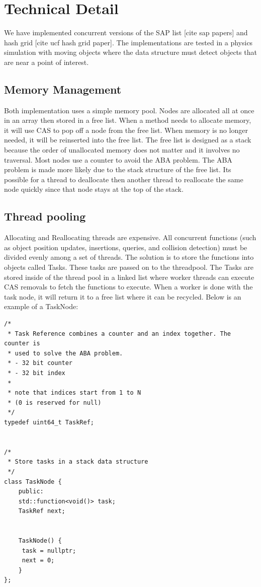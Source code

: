 \documentclass[conference]{IEEEtran}
\begin{document}
\section{Technical Detail}
We have implemented concurrent versions of the SAP list [cite sap papers] and hash grid [cite ucf hash grid paper]. The implementations are tested in a physics simulation with moving objects where the data structure must detect objects that are near a point of interest.
	\subsection{Memory Management}
	Both implementation uses a simple memory pool. Nodes are allocated all at once in an array then stored in a free list. When a method needs to allocate memory, it will use CAS to pop off a node from the free list. When memory is no longer needed, it will be reinserted into the free list. The free list is designed as a stack because the order of unallocated memory does not matter and it involves no traversal. Most nodes use a counter to avoid the ABA problem. The ABA problem is made more likely due to the stack structure of the free list. It\textquotesingle s possible for a thread to deallocate then another thread to reallocate the same node quickly since that node stays at the top of the stack.
	
	\subsection{Thread pooling}
	Allocating and Reallocating threads are expensive. All concurrent functions (such as object position updates, insertions, queries, and collision detection) must be divided evenly among a set of threads. The solution is to store the functions into objects called Tasks. These tasks are passed on to the threadpool. The Tasks are stored inside of the thread pool in a linked list where worker threads can execute CAS removals to fetch the functions to execute. When a worker is done with the task node, it will return it to a free list where it can be recycled. Below is an example of a TaskNode:


\begin{lstlisting}
/*
 * Task Reference combines a counter and an index together. The counter is
 * used to solve the ABA problem.
 * - 32 bit counter
 * - 32 bit index
 *
 * note that indices start from 1 to N
 * (0 is reserved for null)
 */
typedef uint64_t TaskRef;


/*
 * Store tasks in a stack data structure
 */
class TaskNode {
    public:
    std::function<void()> task;
    TaskRef next;


    TaskNode() {
   	 task = nullptr;
   	 next = 0;
    }
};
\end{lstlisting}
\end{document}
